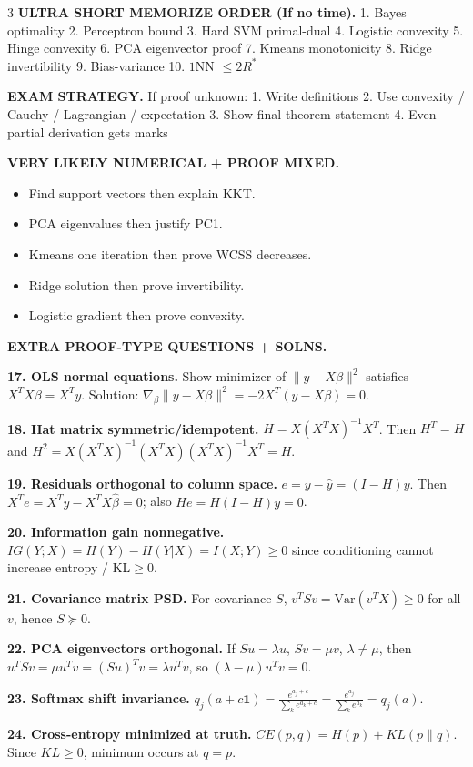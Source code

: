 \documentclass[8pt,fleqn]{extarticle}
\begin{document}
\begin{multicols}{3}
\textbf{ULTRA SHORT MEMORIZE ORDER (If no time).}
1. Bayes optimality
2. Perceptron bound
3. Hard SVM primal-dual
4. Logistic convexity
5. Hinge convexity
6. PCA eigenvector proof
7. Kmeans monotonicity
8. Ridge invertibility
9. Bias-variance
10. $1$NN $\le 2R^*$

\textbf{EXAM STRATEGY.}
If proof unknown:
1. Write definitions
2. Use convexity / Cauchy / Lagrangian / expectation
3. Show final theorem statement
4. Even partial derivation gets marks

\textbf{VERY LIKELY NUMERICAL + PROOF MIXED.}
\begin{itemize}
\item Find support vectors then explain KKT.
\item PCA eigenvalues then justify PC1.
\item Kmeans one iteration then prove WCSS decreases.
\item Ridge solution then prove invertibility.
\item Logistic gradient then prove convexity.
\end{itemize}

\textbf{EXTRA PROOF-TYPE QUESTIONS + SOLNS.}

\textbf{17. OLS normal equations.} Show minimizer of $\|y-X\beta\|^2$ satisfies $X^TX\beta=X^Ty$. Solution: $\nabla_\beta\|y-X\beta\|^2=-2X^T(y-X\beta)=0$.

\textbf{18. Hat matrix symmetric/idempotent.} $H=X(X^TX)^{-1}X^T$. Then $H^T=H$ and $H^2=X(X^TX)^{-1}(X^TX)(X^TX)^{-1}X^T=H$.

\textbf{19. Residuals orthogonal to column space.} $e=y-\hat y=(I-H)y$. Then $X^Te=X^Ty-X^TX\hat\beta=0$; also $He=H(I-H)y=0$.

\textbf{20. Information gain nonnegative.} $IG(Y;X)=H(Y)-H(Y|X)=I(X;Y)\ge0$ since conditioning cannot increase entropy / KL$\ge0$.

\textbf{21. Covariance matrix PSD.} For covariance $S$, $v^TSv=\mathrm{Var}(v^TX)\ge0$ for all $v$, hence $S\succeq0$.

\textbf{22. PCA eigenvectors orthogonal.} If $Su=\lambda u$, $Sv=\mu v$, $\lambda\neq\mu$, then $u^TSv=\mu u^Tv=(Su)^Tv=\lambda u^Tv$, so $(\lambda-\mu)u^Tv=0$.

\textbf{23. Softmax shift invariance.} $\displaystyle q_j(a+c\mathbf1)=\frac{e^{a_j+c}}{\sum_k e^{a_k+c}}=\frac{e^{a_j}}{\sum_k e^{a_k}}=q_j(a)$.

\textbf{24. Cross-entropy minimized at truth.} $CE(p,q)=H(p)+KL(p\|q)$. Since $KL\ge0$, minimum occurs at $q=p$.


\end{multicols}
\end{document}

